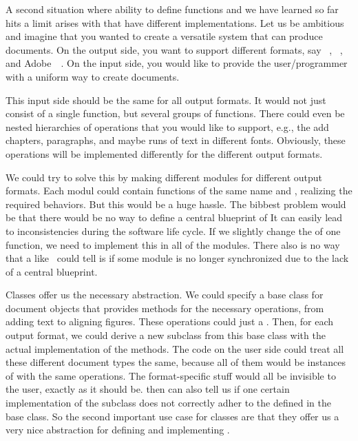 A second situation where ability to define functions and we have learned so far hits a limit arises with  that have different implementations.
Let us be ambitious and imagine that you wanted to create a versatile system that can produce documents.
On the output side, you want to support different formats, say \libreoffice~\cite{DF2024LTDF,GL2012LTSOOSSCBAFACSOL}, \microsoftWord~\cite{MS2024MW,DR2019STFAWAUMW}, and Adobe~~\cite{A2024WDPM,A2008P3DMPDFP1P1}.
On the input side, you would like to provide the user/programmer with a uniform way to create documents.

This input side  should be the same for all output formats.
It would not just consist of a single function, but several groups of functions.
There could even be nested hierarchies of operations that you would like to support, e.g., the add chapters, paragraphs, and maybe runs of text in different fonts.
Obviously, these operations will be implemented differently for the different output formats.

We could try to solve this by making different modules for different output formats.
Each modul could contain functions of the same name and , realizing the required behaviors.
But this would be a huge hassle.
The bibbest problem would be that there would be no way to define a central blueprint of 
It can easily lead to inconsistencies during the software life cycle.
If we slightly change the  of one function, we need to implement this in all of the modules.
There also is no way that a  like \ruff\ could tell is if some module is no longer synchronized due to the lack of a central blueprint.

Classes offer us the necessary abstraction.
We could specify a base class  for document objects that provides methods for the necessary operations, from adding text to aligning figures.
These operations could just  a .
Then, for each output format, we could derive a new subclass from this base class with the actual implementation of the methods.
The code on the user side could treat all these different document types the same, because all of them would be instances of  with the same operations.
The format-specific stuff would all be invisible to the user, exactly as it should be.
 then can also tell us if one certain implementation of the subclass does not correctly adher to the  defined in the base class.
So the second important use case for classes are that they offer us a very nice abstraction for defining and implementing .

